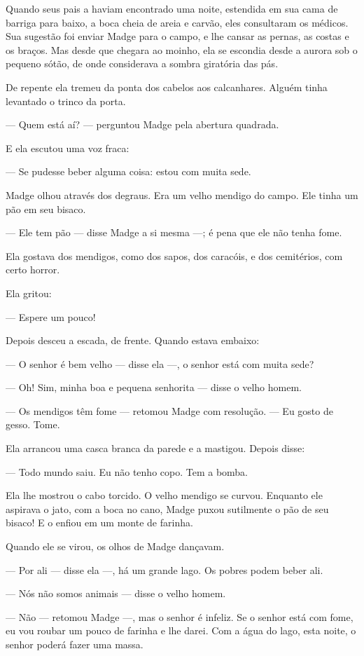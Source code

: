 Quando seus pais a haviam encontrado uma noite, estendida em sua cama
de barriga para baixo, a boca cheia de areia e carvão, eles consultaram os
médicos. Sua sugestão foi enviar Madge para o campo, e lhe cansar as
pernas, as costas e os braços. Mas desde que chegara ao moinho, ela se
escondia desde a aurora sob o pequeno sótão, de onde considerava a sombra
giratória das pás.

De repente ela tremeu da ponta dos cabelos aos calcanhares. Alguém
tinha levantado o trinco da porta.

--- Quem está aí? --- perguntou Madge pela abertura quadrada.

E ela escutou uma voz fraca:

--- Se pudesse beber alguma coisa: estou com muita sede.

Madge olhou através dos degraus. Era um velho mendigo do campo. Ele
tinha um pão em seu bisaco.

--- Ele tem pão --- disse Madge a si mesma ---; é pena que ele não tenha fome.

Ela gostava dos mendigos, como dos sapos, dos caracóis, e dos
cemitérios, com certo horror.

Ela gritou:

--- Espere um pouco!

Depois desceu a escada, de frente. Quando estava embaixo:

--- O senhor é bem velho --- disse ela ---, o senhor está com muita sede?

--- Oh! Sim, minha boa e pequena senhorita --- disse o velho homem.

--- Os mendigos têm fome --- retomou Madge com resolução. --- Eu gosto de
gesso. Tome.

Ela arrancou uma casca branca da parede e a mastigou. Depois disse:

--- Todo mundo saiu. Eu não tenho copo. Tem a bomba.

Ela lhe mostrou o cabo torcido. O velho mendigo se curvou. Enquanto ele
aspirava o jato, com a boca no cano, Madge puxou sutilmente o pão de seu
bisaco! E o enfiou em um monte de farinha.

Quando ele se virou, os olhos de Madge dançavam.

--- Por ali --- disse ela ---, há um grande lago. Os pobres podem beber ali.

--- Nós não somos animais --- disse o velho homem.

--- Não --- retomou Madge ---, mas o senhor é infeliz. Se o senhor está com
fome, eu vou roubar um pouco de farinha e lhe darei. Com a água do lago,
esta noite, o senhor poderá fazer uma massa.

